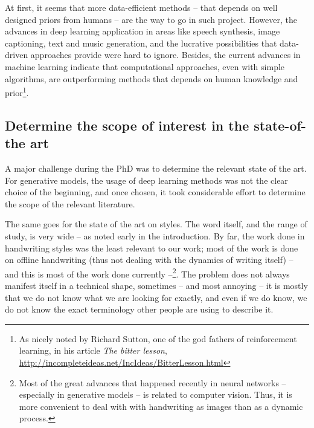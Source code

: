   \par At first, it seems that more data-efficient methods -- that depends on well designed priors from humans -- are the way to go in such project. However, the advances in deep learning application in areas like speech synthesis, image captioning, text and music generation, and the lucrative possibilities that data-driven approaches provide were hard to ignore. Besides, the current advances in machine learning indicate that computational approaches, even with simple algorithms, are outperforming methods that depends on human knowledge and prior\footnote{As nicely noted by Richard Sutton, one of the god fathers of reinforcement learning, in his article \textit{The bitter lesson}, \url{http://incompleteideas.net/IncIdeas/BitterLesson.html}}.

  \subsection{Determine the scope of interest in the state-of-the art}

    \par A major challenge during the PhD was to determine the relevant state of the art. For generative models, the usage of deep learning methods was not the clear choice of the beginning, and once chosen, it took considerable effort to determine the scope of the relevant literature.

    \par The same goes for the state of the art on styles. The word itself, and the range of study, is very wide -- as noted early in the introduction. By far, the work done in handwriting styles was the least relevant to our work; most of the work is done on offline handwriting (thus not dealing with the dynamics of writing itself) -- and this is most of the work done currently --\footnote{Most of the great advances that happened recently in neural networks -- especially in generative models -- is related to computer vision. Thus, it is more convenient to deal with with handwriting as images than as a dynamic process.}. The problem does not always manifest itself in a technical shape, sometimes -- and most annoying -- it is mostly that we do not know what we are looking for exactly, and even if we do know, we do not know the exact terminology other people are using to describe it.


